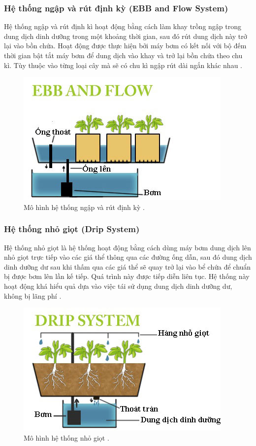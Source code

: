 \documentclass[a4paper,12pt,oneside]{article}
\begin{document}
\subsubsection{Hệ thống ngập và rút định kỳ (EBB and Flow System)}

\noindent Hệ thống ngập và rút định kì hoạt động bằng cách làm khay trồng ngập trong dung dịch dinh dưỡng trong một khoảng thời gian, sau đó rút dung dịch này trở lại vào bồn chứa. Hoạt động được thực hiện bởi máy bơm có kết nối với bộ đếm thời gian bật tắt máy bơm để dung dịch vào khay và trở lại bồn chứa theo chu kì. Tùy thuộc vào từng loại cây mà sẽ có chu kì ngập rút dài ngắn khác nhau \cite{thuycanh}.

\begin{figure}[H]
	\centering
	\includegraphics[scale=.9]{hinh/ebb_flow.jpg}
	\caption{Mô hình hệ thống ngập và rút định kỳ \cite{thuycanh}.}
	\label{fig:ebb_flow}
\end{figure}

\subsubsection{Hệ thống nhỏ giọt (Drip System)}
\noindent Hệ thống nhỏ giọt là hệ thống hoạt động bằng cách dùng máy bơm dung dịch lên nhỏ giọt trực tiếp vào các giá thể thông qua các đường ống dẫn, sau đó dung dịch dinh dưỡng dư sau khi thấm qua các giá thể sẽ quay trở lại vào bể chứa để chuẩn bị được bơm lên lần kế tiếp. Quá trình này được tiếp diễn liên tục. Hệ thống này hoạt động khá hiểu quả dựa vào việc tái sử dụng dung dịch dinh dưỡng dư, không bị lãng phí \cite{thuycanh}.

\begin{figure}[H]
	\centering
	\includegraphics[scale=.9]{hinh/Drip_system.jpg}
	\caption{Mô hình hệ thống nhỏ giọt \cite{thuycanh}.}
	\label{fig:Drip_system}
\end{figure}
\end{document}

